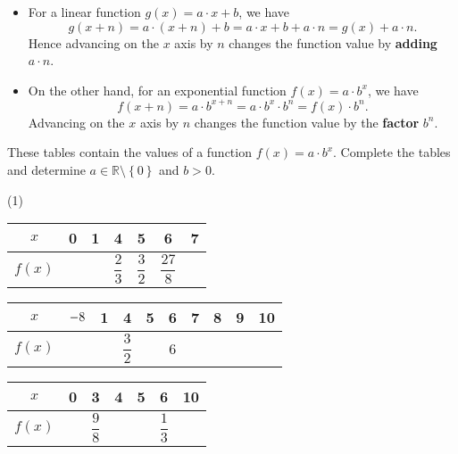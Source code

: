 \begin{itemize}
	\item For a linear function $g\left(x\right)=a\cdot x+b$, we have
	\begin{equation*}
		g\left(x+n\right)=a\cdot\left(x+n\right)+b=a\cdot x+b+a\cdot n=g\left(x\right)+a\cdot n.
	\end{equation*}
	Hence advancing on the $x$ axis by $n$ changes the function value by \textbf{adding} $a\cdot n$.
	\item On the other hand, for an exponential function $f(x)=a\cdot b^x$, we have
	\begin{equation*}
		f\left(x+n\right)=a\cdot b^{x+n}=a\cdot b^x\cdot b^n=f\left(x\right)\cdot b^n.
	\end{equation*}
	Advancing on the $x$ axis by $n$ changes the function value by the \textbf{factor} $b^n$.
\end{itemize}
\begin{exercise}
	These tables contain the values of a function $f\left(x\right)=a\cdot b^x$.
	Complete the tables and determine $a\in\mathbb R\setminus\left\{0\right\}$ and $b>0$.
	\renewcommand{\arraystretch}{2}
	\setlength{\tabcolsep}{15pt}
	\begin{tasks}(1)
		\task \hspace{10pt} \begin{tabular}{|c|c|c|c|c|c|c|}\hline
			$x$ & 0 & 1 & 4 & 5 & 6 & 7 \\ \hline
			$f\left(x\right)$ & & & $\dfrac{2}{3}$ & $\dfrac{3}{2}$ & $\dfrac{27}{8}$ & \\[6pt] \hline
		\end{tabular} \vspace{30pt}
		\task \hspace{10pt} \begin{tabular}{|c|c|c|c|c|c|c|c|c|c|}\hline
			$x$ & $\smash{-}8$ & 1 & 4 & 5 & 6 & 7 & 8 & 9 & 10 \\ \hline
			$f\left(x\right)$ &  &  & $\dfrac{3}{2}$ & & 6 & & & & \\[6pt] \hline
		\end{tabular} \vspace{15pt}
		\task \hspace{10pt} \begin{tabular}{|c|c|c|c|c|c|c|}\hline
			$x$ & 0 & 3 & 4 & 5 & 6 & 10 \\ \hline
			$f\left(x\right)$ &  & $\dfrac{9}{8}$ &  & & $\dfrac{1}{3}$ & \\[6pt] \hline
		\end{tabular}
	\end{tasks}
\end{exercise}
